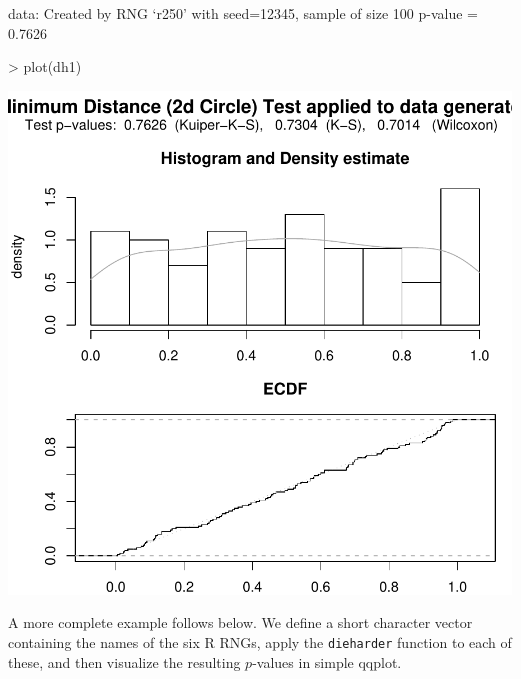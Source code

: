 \documentclass[12pt]{article}
\begin{document}
\begin{center}
\begin{footnotesize}
\begin{Schunk}
\begin{Soutput}
data:  Created by RNG `r250' with seed=12345, sample of size 100 
p-value = 0.7626
\end{Soutput}
\begin{Sinput}
> plot(dh1)
\end{Sinput}
\end{Schunk}
\includegraphics{RDieHarder-rd-example1}
% 
\end{footnotesize}
\end{center}

A more complete example follows below.  We define a short character vector
containing the names of the six R RNGs, apply the \texttt{dieharder} function to
each of these, and then visualize the resulting $p$-values in simple qqplot.
\end{document}
